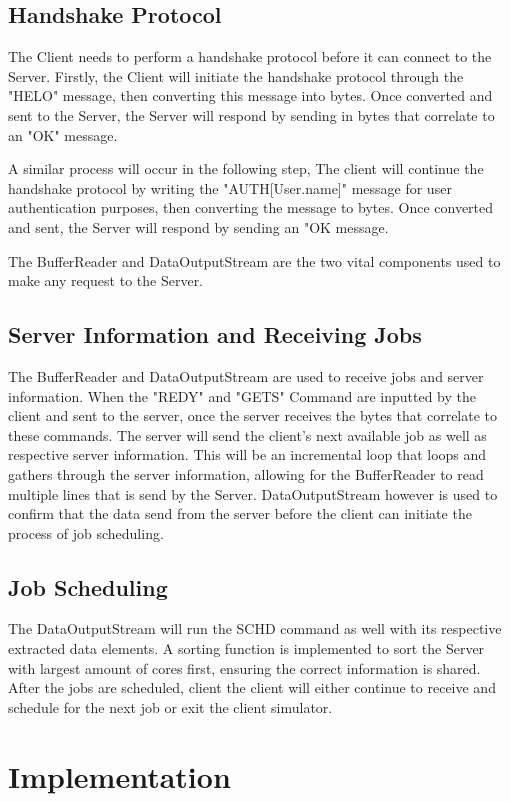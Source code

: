 \documentclass[a4paper]{article} %
\begin{document}
\subsection{Handshake Protocol}
The Client needs to perform a handshake protocol \cite{handshake} before it can connect to the Server. Firstly, the Client will initiate the handshake protocol through the "HELO" message, then converting this message into bytes. Once converted and sent to the Server, the Server will respond by sending in bytes that correlate to an "OK" message. 
\bigskip

A similar process will occur in the following step, The client will continue the handshake protocol by writing the "AUTH[User.name]" message for user authentication purposes, then converting the message to bytes. Once converted and sent, the Server will respond by sending an "OK message. 
\bigskip

The BufferReader and DataOutputStream are the two vital components used to make any request to the Server.

\subsection{Server Information and Receiving Jobs}
The BufferReader and DataOutputStream are used to receive jobs and server information. When the "REDY" and "GETS" Command are inputted by the client and sent to the server, once the server receives the bytes that correlate to these commands. The server will send the client's next available job as well as respective server information. This will be an incremental loop that loops and gathers through the server information, allowing for the BufferReader to read multiple lines that is send by the Server. DataOutputStream however is used to confirm that the data send from the server before the client can initiate the process of job scheduling.

\subsection{Job Scheduling }
The DataOutputStream will run the SCHD command as well with its respective extracted data elements. A sorting function is implemented to sort the Server with largest amount of cores first, ensuring the correct information is shared. After the jobs are scheduled, client the client will either continue to receive and schedule for the next job or exit the client simulator.

\section{Implementation}
\label{sec:section4}
\end{document}
